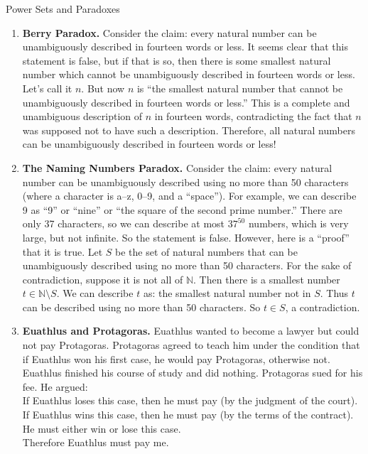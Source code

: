 \begin{section}{Power Sets and Paradoxes}
\begin{problem}
\begin{enumerate}[label=\textrm{(\alph*)}]
\item \textbf{Berry Paradox.} Consider the claim: every natural number can be unambiguously described in fourteen words or less. It seems clear that this statement is false, but if that is so, then there is some smallest natural number which cannot be unambiguously described in fourteen words or less. Let's call it $n$. But now $n$ is ``the smallest natural number that cannot be unambiguously described in fourteen words or less.'' This is a complete and unambiguous description of $n$ in fourteen words, contradicting the fact that $n$ was supposed not to have such a description. Therefore, all natural numbers can be unambiguously described in fourteen words or less!

\item \textbf{The Naming Numbers Paradox.} Consider the claim: every natural number can be unambiguously described using no more than 50 characters (where a character is a--z, 0--9, and a ``space''). For example, we can describe 9 as ``9'' or ``nine'' or ``the square of the second prime number.'' There are only 37 characters, so we can describe at most $37^{50}$ numbers, which is very large, but not infinite. So the statement is false. However, here is a ``proof'' that it is true. Let $S$ be the set of natural numbers that can be unambiguously described using no more than 50 characters. For the sake of contradiction, suppose it is not all of $\mathbb{N}$. Then there is a smallest number $t\in\mathbb{N}\setminus S$. We can describe $t$ as: the smallest natural number not in $S$.  Thus $t$ can be described using no more than 50 characters. So $t\in S$, a contradiction.

\item \textbf{Euathlus and Protagoras.} Euathlus wanted to become a lawyer but could not pay Protagoras. Protagoras agreed to teach him under the condition that if Euathlus won his first case, he would pay Protagoras, otherwise not. Euathlus finished his course of study and did nothing. Protagoras sued for his fee. He argued:\\

\noindent If Euathlus loses this case, then he must pay (by the judgment of the court).\\
If Euathlus wins this case, then he must pay (by the terms of the contract).\\
He must either win or lose this case.\\
Therefore Euathlus must pay me.\\


\end{enumerate}
\end{problem}
\end{section}
